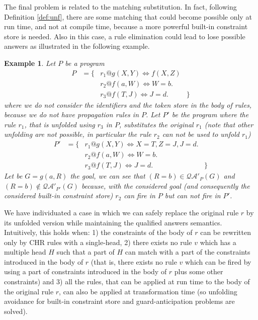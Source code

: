 \documentclass[final]{acmtrans2e}
\newtheorem{exa}[theorem]{Example}
\newenvironment{example}{\begin{exa}}{\end{exa}}
\begin{document}
The final problem is related to the matching substitution. In fact,
following Definition \ref{def:unf}, there are some matching that could become
possible only at run time, and not at compile time, because a more powerful
built-in constraint store is needed. Also in this case, a rule elimination could lead to lose
possible answers as illustrated in the following example.

\begin{example}\label{ex:matching}
Let $P$ be a program
\[
\begin{array}{lclr}P&=\{&
r_1@g(X, Y) \Leftrightarrow f(X, Z)&\\
&&r_2@f(a, W) \Leftrightarrow W=b.&\\
&&r_3@f(T, J) \Leftrightarrow J=d.&\}
\end{array}
\]
where we do not consider the identifiers and the token store in the
body of rules, because we do not have propagation rules in $P$.
Let $P'$ be the program where the rule $r_1$, that is unfolded using $r_3$ in $P$,
substitutes the original $r_1$ (note that other unfolding are not possible, in
particular the rule $r_2$ can not be used to unfold $r_1$)
\[
\begin{array}{lclr}P'&=\{&
r_1@g(X, Y) \Leftrightarrow X=T, Z=J, J=d .&\\
&&r_2@f(a, W) \Leftrightarrow W=b.&\\
&&r_3@f(T, J) \Leftrightarrow J=d.&\}
\end{array}
\]
Let be $G=g(a, R)$ the goal, we can see that
$(R=b)\in\mathcal{QA'}_P(G)$ and  $(R=b)\not\in\mathcal{QA'}_{P'}(G)$ because,
with the considered goal (and consequently
the considered built-in constraint store) $r_2$ can fire in $P$ but can not fire in
$P'$.
\end{example}

We have individuated a case in which we can safely replace the
original rule $r$ by its unfolded version while maintaining the
qualified answers semantics. Intuitively, this holds when: 1)  the
constraints of the body of  $r$ can
 be rewritten only by CHR rules with a single-head, 2) there exists
no rule $v$ which has a multiple head $H$ such that a part of $H$
can match with a part of the constraints introduced in the body of
$r$ (that is, there exists no rule $v$ which can be fired by using
a part of constraints introduced in the body of $r$ plus some
other constraints) and 3) all the rules, that can be applied at run
time to the body of the original rule $r$, can also be applied at
transformation time (so unfolding avoidance for built-in constraint
store and guard-anticipation problems are solved).
\end{document}
